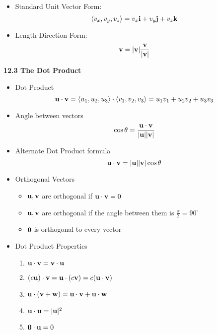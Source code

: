 \begin{itemize}
\begin{itemize}
\begin{itemize}
    \item Standard Unit Vector Form:
      \[\left<v_x,v_y,v_z\right> = v_x\mathbf{i} + v_y\mathbf{j} + v_z\mathbf{k}\]

    \item Length-Direction Form:
      \[\mathbf{v} = |\mathbf{v}|\frac{\mathbf{v}}{|\mathbf{v}|}\]

    \end{itemize}
  \end{itemize}
\end{itemize}

\newpage
  
\centerline{\bf 12.3 The Dot Product}
  
    \begin{itemize}
    \item Dot Product
      \[ \mathbf{u} \cdot \mathbf{v} = \left<u_1,u_2,u_3\right>\cdot\left<v_1,v_2,v_3\right> = u_1v_1 + u_2v_2 + u_3v_3 \]
  
    \item Angle between vectors
      \[\cos\theta = \frac{\mathbf{u}\cdot\mathbf{v}}{|\mathbf{u}||\mathbf{v}|}\] 
      
    \item Alternate Dot Product formula
      \[\mathbf{u} \cdot \mathbf{v} = |\mathbf{u}||\mathbf{v}|\cos \theta \]
      
    \item Orthogonal Vectors
      \begin{itemize}
      \item  $\mathbf{u},\mathbf{v}$ are orthogonal if $\mathbf{u} \cdot \mathbf{v} = 0$
      \item $\mathbf{u},\mathbf{v}$ are orthogonal if the angle between them is $\frac{\pi}{2} = 90^\circ$
      \item $\mathbf{0}$ is orthogonal to every vector
      \end{itemize}
    
    \item Dot Product Properties
      \begin{enumerate}
      \item $\mathbf{u} \cdot \mathbf{v} = \mathbf{v}\cdot\mathbf{u}$
      \item $(c\mathbf{u})\cdot \mathbf{v} = \mathbf{u} \cdot (c\mathbf{v}) = c(\mathbf{u} \cdot \mathbf{v})$
      \item $\mathbf{u} \cdot (\mathbf{v} + \mathbf{w}) = \mathbf{u}\cdot\mathbf{v} + \mathbf{u}\cdot \mathbf{w}$
      \item $\mathbf{u} \cdot \mathbf{u} = |\mathbf{u}|^2$
      \item $\mathbf{0} \cdot \mathbf{u} = 0$
      \end{enumerate}
    

\end{itemize}

